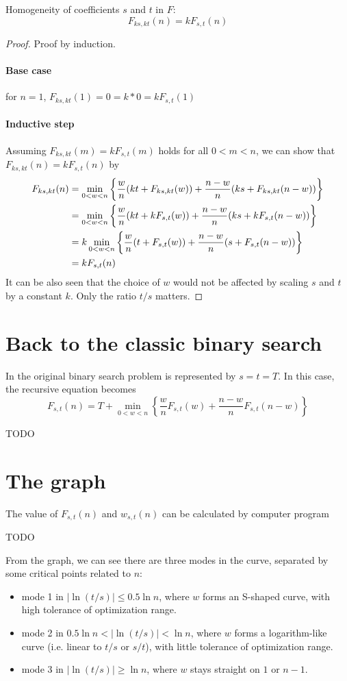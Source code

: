 \documentclass[]{article}
\begin{document}
\begin{lemma} Homogeneity of coefficients $s$ and $t$ in $F$: 
	\[
	F_{ks,kt}(n) = k F_{s,t}(n)
	\]
\end{lemma}
\begin{proof}
	Proof by induction. 
	\paragraph{Base case} for $n = 1$, $F_{ks,kt}(1) = 0 = k*0 = kF_{s,t}(1)$
	\paragraph{Inductive step} Assuming $F_{ks,kt}(m) = k F_{s,t}(m)$ holds for all $0 < m < n$, we can show that $F_{ks,kt}(n) = k F_{s,t}(n)$ by 
	\begin{align*}
	F_{ks,kt}(n) &= \min_{0<w<n}\left\{\frac{w}{n}(kt + F_{ks,kt}(w)) + \frac{n-w}{n}(ks + F_{ks,kt}(n-w))\right\}\\
	&=\min_{0<w<n}\left\{\frac{w}{n}(kt + kF_{s,t}(w)) + \frac{n-w}{n}(ks + kF_{s,t}(n-w))\right\}\\
	&=k\min_{0<w<n}\left\{\frac{w}{n}(t + F_{s,t}(w)) + \frac{n-w}{n}(s + F_{s,t}(n-w))\right\}\\
	&=kF_{s,t}(n)\qedhere
	\end{align*}
	It can be also seen that the choice of $w$ would not be affected by scaling $s$ and $t$ by a constant $k$. Only the ratio $t/s$ matters.
\end{proof}	

\section{Back to the classic binary search}
In the original binary search problem is represented by $s = t = T$. In this case, the recursive equation becomes
\[
F_{s,t}(n) = T + \min_{0<w<n}\left\{\frac{w}{n}F_{s,t}(w) + \frac{n-w}{n}F_{s,t}(n-w)\right\}
\]

TODO

\section{The graph}

The value of $F_{s,t}(n)$ and $w_{s,t}(n)$ can be calculated by computer program

TODO

From the graph, we can see there are three modes in the curve, separated by some critical points related to $n$:
\begin{itemize}
	\item mode 1 in $|\ln(t/s)| \leq 0.5\ln n$, where $w$ forms an S-shaped curve, with high tolerance of optimization range.
	\item mode 2 in $ 0.5\ln n< |\ln(t/s)| < \ln n$, where $w$ forms a logarithm-like curve (i.e. linear to $t/s$ or $s/t$), with little tolerance of optimization range.
	\item mode 3 in $|\ln(t/s)| \geq \ln n$, where $w$ stays straight on $1$ or $n-1$.
\end{itemize}
\end{document}
